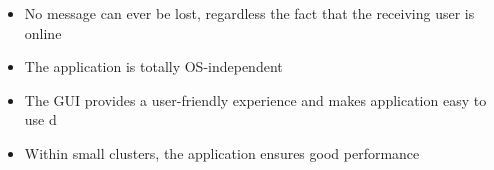 \begin{itemize}
	\item No message can ever be lost, regardless the fact that the receiving user is online
	\item The application is totally OS-independent
	\item The GUI provides a user-friendly experience and makes application easy to use d
	\item Within small clusters, the application ensures good performance
\end{itemize}

